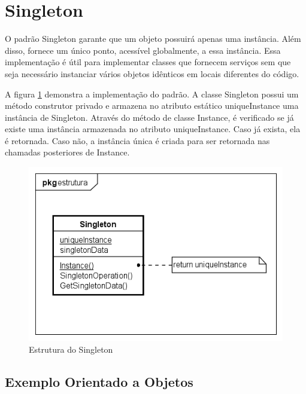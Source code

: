 \section{Singleton}

O padrão Singleton garante que um objeto possuirá apenas uma 
instância. Além disso, fornece um único ponto, acessível 
globalmente, a essa instância. Essa implementação é útil 
para implementar classes que fornecem serviços sem que seja 
necessário instanciar vários objetos idênticos em 
locais diferentes do código.

A figura \ref{singleton_struct} demonstra a implementação 
do padrão. A classe Singleton possui um método construtor 
privado e armazena no atributo estático uniqueInstance uma 
instância de Singleton. Através do método de classe 
Instance, é verificado se já existe uma instância 
armazenada no atributo uniqueInstance. Caso já exista, 
ela é retornada. Caso não, a instância única é criada 
para ser retornada nas chamadas posteriores de Instance.

\begin{figure}[htb]
	\caption{\label{singleton_struct}Estrutura do Singleton}
	\begin{center}
	    \includegraphics[scale=0.6]{5_padroes-contexto-funcional/5.1_criacionais/5.1.5_singleton/singleton_estrutura.png}
	\end{center}
\end{figure}

\subsection*{Exemplo Orientado a Objetos}

